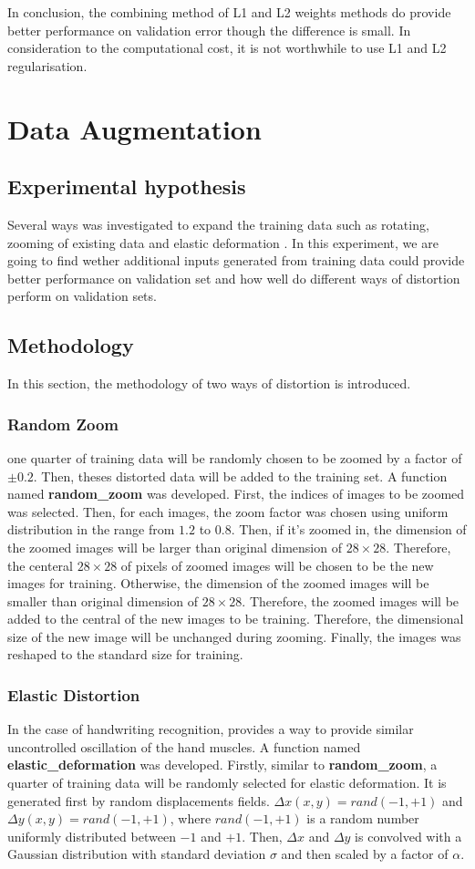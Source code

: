 \documentclass[11pt]{article}
\begin{document}
In conclusion, the combining method of L1 and L2 weights methods do provide better performance on validation error though the difference is small. In consideration to the computational cost, it is not worthwhile to use L1 and L2 regularisation.

\newpage
\section{Data Augmentation}
\subsection{Experimental hypothesis}
Several ways was investigated to expand the training data such as rotating, zooming of existing data and elastic deformation \cite{Elastic}. In this experiment, we are going to find wether additional inputs generated from training data could provide better performance on validation set and how well do different ways of distortion perform on validation sets.
\subsection{Methodology}
In this section, the methodology of two ways of distortion is introduced.
\subsubsection{Random Zoom}
one quarter of training data will be randomly chosen to be zoomed by a factor of $\pm 0.2$. Then, theses distorted data will be added to the training set.
A function named {\bf random\_zoom} was developed. First, the indices of images to be zoomed was selected. Then, for each images, the zoom factor was chosen using uniform distribution in the range from $1.2$ to $0.8$. Then, if it's zoomed in, the dimension of the zoomed images will be larger than original dimension of $28\times 28 $. Therefore, the centeral $28 \times 28$ of pixels of zoomed images will be chosen to be the new images for training. Otherwise, the dimension of the zoomed images will be smaller than original dimension of $28 \times 28$. Therefore, the zoomed images will be added to the central of the new images to be training. Therefore, the dimensional size of the new image will be unchanged during zooming. Finally, the images was reshaped to the standard size for training. 
\subsubsection{Elastic Distortion}
In the case of handwriting recognition, \cite{Elastic} provides a way to provide similar uncontrolled oscillation of the hand muscles. A function named {\bf elastic\_deformation} was developed. Firstly, similar to {\bf random\_zoom}, a quarter of training data will be randomly selected for elastic deformation. It is generated first by random displacements fields. $\Delta x(x,y) = rand(-1, +1)$ and $\Delta y(x,y) = rand(-1, +1)$, where $rand(-1, +1)$ is a random number uniformly distributed between $-1$ and $+1$. Then, $\Delta x$ and $\Delta y$ is convolved with a Gaussian distribution with standard deviation $\sigma$ and then scaled by a factor of $\alpha$.
\end{document}
